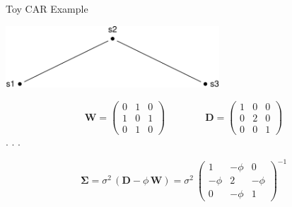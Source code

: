 \documentclass[11pt,ignorenonframetext,]{beamer}
\begin{document}
\begin{frame}[t]{Toy CAR Example}
\protect\hypertarget{toy-car-example}{}

\begin{center}\includegraphics[width=0.6\textwidth]{Lec18_files/figure-beamer/unnamed-chunk-1-1} \end{center}

\pause

\[
\symbf{W} = \begin{pmatrix}
0 & 1 & 0 \\
1 & 0 & 1 \\
0 & 1 & 0 
\end{pmatrix}
\qquad\qquad
\symbf{D} = \begin{pmatrix}
1 & 0 & 0 \\
0 & 2 & 0 \\
0 & 0 & 1 
\end{pmatrix}
\] . . .

\[
\symbf{\Sigma} = \sigma^2 \, (\symbf{D} - \phi \, \symbf{W}) = \sigma^2~\begin{pmatrix}
1 & -\phi & 0 \\
-\phi & 2 & -\phi \\
0 & -\phi & 1 
\end{pmatrix}^{-1}
\]

\end{frame}
\end{document}
